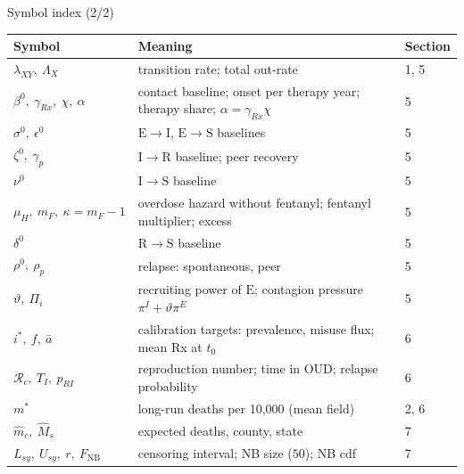 ﻿\documentclass[9pt,aspectratio=169]{beamer}
\newcommand{\Sc}{\mathrm{S}}\newcommand{\Ec}{\mathrm{E}}\newcommand{\Ic}{\mathrm{I}}\newcommand{\Rc}{\mathrm{R}}\newcommand{\Dc}{\mathrm{D}}
\newcommand{\Rzero}{\mathcal R_c}
\newcommand{\nbc}{F_{\mathrm{NB}}}
\begin{document}
\begin{frame}{Symbol index (2/2)}
 \footnotesize
 \renewcommand{\arraystretch}{1.3}
 \begin{tabularx}{\textwidth}{@{}l X l@{}}
 \toprule Symbol & Meaning & Section\\\midrule
 $\lambda_{XY},\ \Lambda_X$ & transition rate; total out-rate & 1, 5\\
 $\beta^0,\ \gamma_{Rx},\ \chi,\ \alpha$ & contact baseline; onset per therapy year; therapy share; $\alpha=\gamma_{Rx}\chi$ & 5\\
 $\sigma^0,\ \epsilon^0$ & $\Ec\to\Ic$, $\Ec\to\Sc$ baselines & 5\\
 $\zeta^0,\ \gamma_p$ & $\Ic\to\Rc$ baseline; peer recovery & 5\\
 $\nu^0$ & $\Ic\to\Sc$ baseline & 5\\
 $\mu_H,\ m_F,\ \kappa=m_F-1$ & overdose hazard without fentanyl; fentanyl multiplier; excess & 5\\
 $\delta^0$ & $\Rc\to\Sc$ baseline & 5\\
 $\rho^0,\ \rho_p$ & relapse: spontaneous, peer & 5\\
 $\vartheta,\ \Pi_i$ & recruiting power of $\Ec$; contagion pressure $\pi^I+\vartheta\pi^E$ & 5\\
 $i^\ast,\ f,\ \bar a$ & calibration targets: prevalence, misuse flux; mean Rx at $t_0$ & 6\\
 $\Rzero,\ T_I,\ p_{RI}$ & reproduction number; time in OUD; relapse probability & 6\\
 $m^\ast$ & long-run deaths per 10{,}000 (mean field) & 2, 6\\
 $\widehat m_c,\ \widehat M_s$ & expected deaths, county, state & 7\\
 $L_{sy},\ U_{sy},\ r,\ \nbc$ & censoring interval; NB size ($50$); NB cdf & 7\\
 \bottomrule
 \end{tabularx}
\end{frame}
\end{document}
